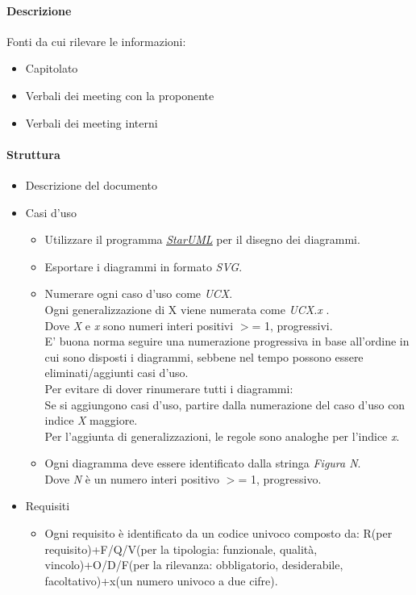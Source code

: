 \documentclass[a4paper, 12pt]{article}
\begin{document}
\paragraph{Descrizione}
Fonti da cui rilevare le informazioni:
\begin{itemize}
	\item Capitolato
	\item Verbali dei meeting con la proponente
	\item Verbali dei meeting interni
\end{itemize}
\paragraph{Struttura}
\begin{itemize}
	\item Descrizione del documento
	\item Casi d'uso
	\begin{itemize}
		\item Utilizzare il programma \href{https://staruml.io/}{\textit{\underline{StarUML}}} per il disegno dei diagrammi.
		\item Esportare i diagrammi in formato \textit{SVG}.
		\item Numerare ogni caso d'uso come \textit{UCX}. \\
		Ogni generalizzazione di X viene numerata come \textit{UCX.x} .\\
		Dove \textit{X} e \textit{x} sono numeri interi positivi $>$= 1, progressivi.\\
		E' buona norma seguire una numerazione progressiva in base all'ordine in cui sono 
		disposti i diagrammi, sebbene nel tempo possono essere eliminati/aggiunti casi d'uso.\\
		Per evitare di dover rinumerare tutti i diagrammi: \\
		Se si aggiungono casi d'uso, partire dalla numerazione del caso d'uso con indice \textit{X} maggiore.\\
		Per l'aggiunta di generalizzazioni, le regole sono analoghe per l'indice \textit{x}.
		\item Ogni diagramma deve essere identificato dalla stringa \textit{Figura N}.\\
		Dove \textit{N} è un numero interi positivo $>$= 1, progressivo.
	\end{itemize}
	\item Requisiti
	\begin{itemize}
		\item Ogni requisito è identificato da un codice univoco composto da: R(per requisito)+F/Q/V(per la tipologia: 
		funzionale, qualità, vincolo)+O/D/F(per la rilevanza: obbligatorio, desiderabile, 
		facoltativo)+x(un numero univoco a due cifre).
	\end{itemize}
\end{itemize}
\end{document}
